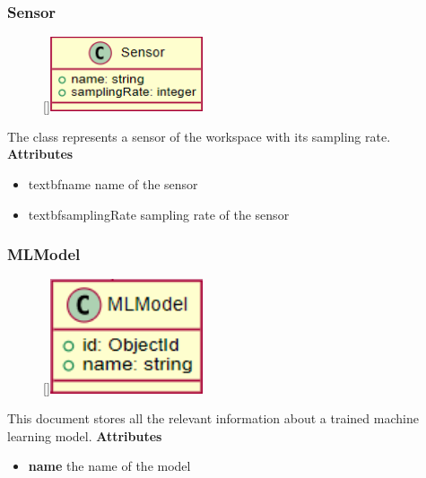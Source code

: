 \subsubsection{Sensor}
\label{mm-Sensor}
\begin{figure}
    \raisebox{0pt}[\dimexpr{}\baselineskip\relax]{\includegraphics[width=4.5cm]{classes/model-management/3.png}}
\end{figure} 
\par
The class represents a sensor of the workspace with its sampling rate.
\newline
\newline
\textbf{Attributes}
\begin{itemize}
    \item textbf{name} name of the sensor
    \item textbf{samplingRate} sampling rate of the sensor
\end{itemize}

\subsubsection{MLModel}
\label{MLModel}
\begin{figure}
    \raisebox{0pt}[\dimexpr{}\baselineskip\relax]{\includegraphics[width=4.5cm]{classes/model-management/4.png}}
\end{figure} 
\par
This document stores all the relevant information about a trained machine learning model.
\newline
\newline
\textbf{Attributes}
\begin{itemize}
    \item \textbf{name} the name of the model
\end{itemize}

